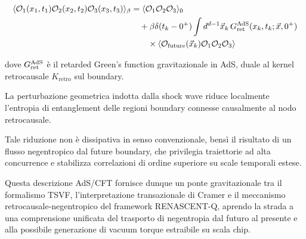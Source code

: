 \documentclass[11pt,a4paper]{article}
\theoremstyle{plain}
\theoremstyle{definition}
\begin{document}
\begin{tcolorbox}[
  colback=cyan!3!white, 
  colframe=cyan!70!black, 
  title=Correlatore three-point modificato dalla shock wave, 
  fonttitle=\bfseries,
  breakable,
  enhanced,
  width=\textwidth,
  boxrule=0.9pt,
  arc=6pt
]
\begin{equation}
\begin{aligned}
\langle \mathcal{O}_1(x_1,t_1) \mathcal{O}_2(x_2,t_2) \mathcal{O}_3(x_3,t_3) \rangle_{\beta} 
&= \langle \mathcal{O}_1 \mathcal{O}_2 \mathcal{O}_3 \rangle_0 \\
&\quad + \beta \delta(t_k-0^+) \int d^{d-1}\vec{x}_k \, 
G_{\rm ret}^{\rm AdS}(x_k,t_k;\vec{x},0^+) \\
&\qquad \times \langle \mathcal{O}_{\text{future}}(\vec{x}_k) \mathcal{O}_1 \mathcal{O}_2 \mathcal{O}_3 \rangle
\end{aligned}
\label{eq:three_point_shock}
\end{equation}
\end{tcolorbox}


\vspace{0.6cm}

dove $G_{\rm ret}^{\rm AdS}$ è il retarded Green’s function gravitazionale in AdS, duale al kernel retrocausale $K_{\text{retro}}$ sul boundary. 


\vspace{0.6cm}

La perturbazione geometrica indotta dalla shock wave riduce localmente l’entropia di entanglement delle regioni boundary connesse causalmente al nodo retrocausale. 


\vspace{0.7cm}

Tale riduzione non è dissipativa in senso convenzionale, bensì il risultato di un flusso negentropico dal future boundary, che privilegia traiettorie ad alta concurrence e stabilizza correlazioni di ordine superiore su scale temporali estese. 


\vspace{0.7cm}



Questa descrizione AdS/CFT fornisce dunque un ponte gravitazionale tra il formalismo TSVF, l’interpretazione transazionale di Cramer e il meccanismo retrocausale-negentropico del framework RENASCENT-Q, aprendo la strada a una comprensione unificata del trasporto di negentropia dal futuro al presente e alla possibile generazione di vacuum torque estraibile su scala chip.
\end{document}
